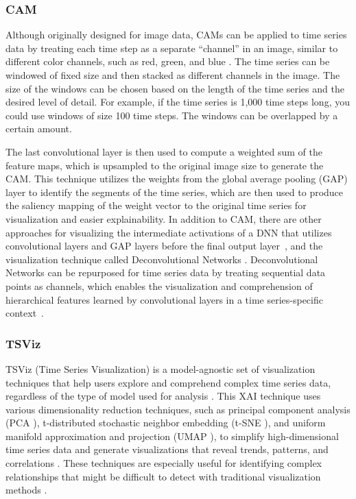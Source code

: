 \documentclass[final,5p,times,twocolumn]{elsarticle}
\begin{document}
\subsubsection{CAM}
Although originally designed for image data, CAMs \cite{zhou2016learning} can be applied to time series data by treating each time step as a separate ``channel'' in an image, similar to different color channels, such as red, green, and blue \cite{wang2017time}. The time series can be windowed of fixed size and then stacked as different channels in the image. The size of the windows can be chosen based on the length of the time series and the desired level of detail. For example, if the time series is 1,000 time steps long, you could use windows of size 100 time steps. The windows can be overlapped by a certain amount. 

The last convolutional layer is then used to compute a weighted sum of the feature maps, which is upsampled to the original image size to generate the CAM. This technique utilizes the weights from the global average pooling (GAP) layer to identify the segments of the time series, %
which are then used to produce the saliency mapping of the weight vector to the original time series for visualization and easier explainability. In addition to CAM, there are other approaches for visualizing the intermediate activations of a DNN that utilizes convolutional layers and GAP layers before the final output layer~\cite{springenberg2014striving, springenberg2015better}, and the visualization technique called Deconvolutional Networks %
\cite{zeiler2014visualizing}. Deconvolutional Networks can be repurposed for time series data by treating sequential data points as channels, which enables the visualization and comprehension of hierarchical features learned by convolutional layers in a time series-specific context~\cite{song2020representation}.

\subsubsection{TSViz}
TSViz (Time Series Visualization) is a model-agnostic set of visualization techniques that help users explore and comprehend complex time series data, regardless of the type of model used for analysis \cite{siddiqui2019tsviz}. This XAI technique uses various dimensionality reduction techniques, such as principal component analysis (PCA \cite{labrin2020principal}), t-distributed stochastic neighbor embedding (t-SNE \cite{van2014accelerating}), and uniform manifold approximation and projection (UMAP \cite{mcinnes2018umap}), to simplify high-dimensional time series data and generate visualizations that reveal trends, patterns, and correlations \cite{agrawal2021time, roy2020umap}. These techniques are especially useful for identifying complex relationships that might be difficult to detect with traditional visualization methods \cite{munir2021thesis}.
\end{document}
